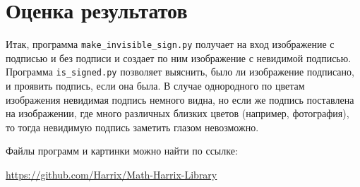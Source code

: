\documentclass[12pt,a4paper]{scrartcl}
\begin{document}
\section{Оценка результатов}
Итак, программа \texttt{make\_invisible\_sign.py} получает на вход изображение с подписью и без подписи и создает по ним изображение с невидимой подписью. Программа \texttt{is\_signed.py} позволяет выяснить, было ли изображение подписано, и проявить подпись, если она была. В случае однородного по цветам изображения невидимая подпись немного видна, но если же подпись поставлена на изображении, где много различных близких цветов (например, фотография), то тогда невидимую подпись заметить глазом невозможно.

Файлы программ и картинки можно найти по ссылке: 

\href{https://github.com/Harrix/Math-Harrix-Library}{https://github.com/Harrix/Math-Harrix-Library}
\end{document}
